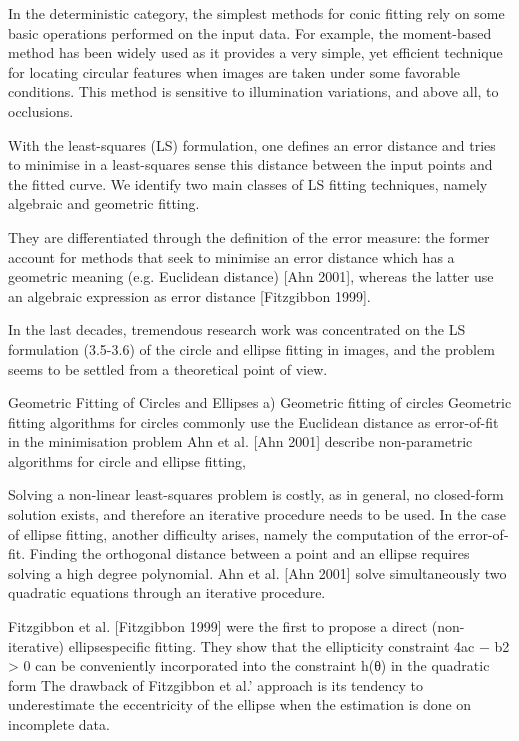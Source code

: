 \documentclass[a4paper]{report}
\begin{document}
In the deterministic category, the simplest methods for conic fitting rely on some
basic operations performed on the input data. For example, the moment-based method has
been widely used as it provides a very simple, yet efficient technique for locating circular features
when images are taken under some favorable conditions.
This method
is sensitive to illumination variations, and above all, to occlusions.

With the least-squares (LS) formulation, one defines an error distance and tries to minimise
in a least-squares sense this distance between the input points and the fitted curve. We identify
two main classes of LS fitting techniques, namely algebraic and geometric fitting.

They are
differentiated through the definition of the error measure: the former account for methods that
seek to minimise an error distance which has a geometric meaning (e.g. Euclidean distance)
[Ahn 2001], whereas the latter use an algebraic expression
as error distance [Fitzgibbon 1999].

In the last decades, tremendous research work was concentrated on the LS formulation (3.5-3.6)
of the circle and ellipse fitting in images, and the problem seems to be settled from a theoretical
point of view.

Geometric Fitting of Circles and Ellipses
a) Geometric fitting of circles
Geometric fitting algorithms for circles commonly use the Euclidean distance as error-of-fit
in the minimisation problem
Ahn et al. [Ahn 2001] describe non-parametric algorithms for circle and ellipse fitting,

Solving a non-linear least-squares problem is costly, as in general, no closed-form solution
exists, and therefore an iterative procedure needs to be used. In the case of ellipse fitting,
another difficulty arises, namely the computation of the error-of-fit. Finding the orthogonal
distance between a point and an ellipse requires solving a high degree polynomial.
Ahn et al. [Ahn 2001] solve simultaneously two quadratic equations through
an iterative procedure. 

Fitzgibbon et al. [Fitzgibbon 1999] were the first to propose a direct (non-iterative) ellipsespecific
fitting. They show that the ellipticity constraint 4ac − b2 > 0 can be conveniently
incorporated into the constraint h(θ) in the quadratic form
The drawback of Fitzgibbon et al.’
approach is its tendency to underestimate the eccentricity of the ellipse when the estimation is
done on incomplete data.
\end{document}
